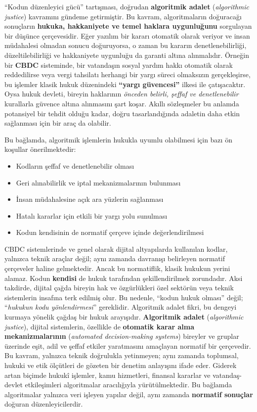 \documentclass[a4paper,12pt]{article}
\begin{document}
“Kodun düzenleyici gücü” tartışması, doğrudan \textbf{algoritmik adalet} (\textit{algorithmic justice}) kavramını gündeme getirmiştir. Bu kavram, algoritmaların doğuracağı sonuçların \textbf{hukuka, hakkaniyete ve temel haklara uygunluğunu} sorgulayan bir düşünce çerçevesidir. Eğer yazılım bir kararı otomatik olarak veriyor ve insan müdahalesi olmadan sonucu doğuruyorsa, o zaman bu kararın denetlenebilirliği, düzeltilebilirliği ve hakkaniyete uygunluğu da garanti altına alınmalıdır. Örneğin bir \textbf{CBDC} sisteminde, bir vatandaşın sosyal yardım hakkı otomatik olarak reddedilirse veya vergi tahsilatı herhangi bir yargı süreci olmaksızın gerçekleşirse, bu işlemler klasik hukuk düzenindeki \textbf{“yargı güvencesi”} ilkesi ile çatışacaktır. Oysa hukuk devleti, bireyin haklarının \textit{önceden belirli, şeffaf ve denetlenebilir} kurallarla güvence altına alınmasını şart koşar. Akıllı sözleşmeler bu anlamda potansiyel bir tehdit olduğu kadar, doğru tasarlandığında adaletin daha etkin sağlanması için bir araç da olabilir.

Bu bağlamda, algoritmik işlemlerin hukukla uyumlu olabilmesi için bazı ön koşullar önerilmektedir:

\begin{itemize}
  \item Kodların şeffaf ve denetlenebilir olması
  \item Geri alınabilirlik ve iptal mekanizmalarının bulunması
  \item İnsan müdahalesine açık ara yüzlerin sağlanması
  \item Hatalı kararlar için etkili bir yargı yolu sunulması
  \item Kodun kendisinin de normatif çerçeve içinde değerlendirilmesi
\end{itemize}

CBDC sistemlerinde ve genel olarak dijital altyapılarda kullanılan kodlar, yalnızca teknik araçlar değil; aynı zamanda davranışı belirleyen normatif çerçeveler haline gelmektedir. Ancak bu normatiflik, klasik hukukun yerini alamaz. Kodun \textbf{kendisi} de hukuk tarafından şekillendirilmek zorundadır. Aksi takdirde, dijital çağda bireyin hak ve özgürlükleri özel sektörün veya teknik sistemlerin insafına terk edilmiş olur. Bu nedenle, “kodun hukuk olması” değil; “\textit{hukukun kodu yönlendirmesi}” gereklidir. Algoritmik adalet fikri, bu dengeyi kurmaya yönelik çağdaş bir hukuk arayışıdır. \textbf{Algoritmik adalet} (\textit{algorithmic justice}), dijital sistemlerin, özellikle de \textbf{otomatik karar alma mekanizmalarının} (\textit{automated decision-making systems}) bireyler ve gruplar üzerinde eşit, adil ve şeffaf etkiler yaratmasını amaçlayan normatif bir çerçevedir. Bu kavram, yalnızca teknik doğrulukla yetinmeyen; aynı zamanda toplumsal, hukuki ve etik ölçütleri de gözeten bir denetim anlayışını ifade eder. Giderek artan biçimde hukukî işlemler, kamu hizmetleri, finansal kararlar ve vatandaş-devlet etkileşimleri algoritmalar aracılığıyla yürütülmektedir. Bu bağlamda algoritmalar yalnızca veri işleyen yapılar değil, aynı zamanda \textbf{normatif sonuçlar} doğuran düzenleyicilerdir.
\end{document}
